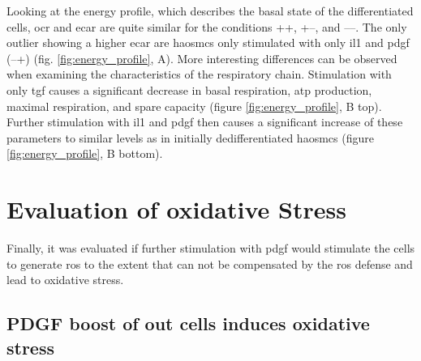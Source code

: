     Looking at the energy profile, which describes the basal state of the differentiated cells, \ac{ocr} and \ac{ecar} are quite similar for the conditions ++, +–, and ––. The only outlier showing a higher \ac{ecar} are \acp{haosmc} only stimulated with only \ac{il1} and \ac{pdgf} (–+) (fig. \ref{fig:energy_profile}, A). More interesting differences can be observed when examining the characteristics of the respiratory chain. Stimulation with only \ac{tgf} causes a significant decrease in basal respiration, \ac{atp} production, maximal respiration, and spare capacity (figure \ref{fig:energy_profile}, B top). Further stimulation with \ac{il1} and \ac{pdgf} then causes a significant increase of these parameters to similar levels as in initially dedifferentiated \acp{haosmc} (figure \ref{fig:energy_profile}, B bottom).

\section{Evaluation of oxidative Stress}
\label{sec:oxStress}
Finally, it was evaluated if further stimulation with \ac{pdgf} would stimulate the cells to generate \ac{ros} to the extent that can not be compensated by the \ac{ros} defense and lead to oxidative stress.

    \subsection{PDGF boost of out cells induces oxidative stress}

